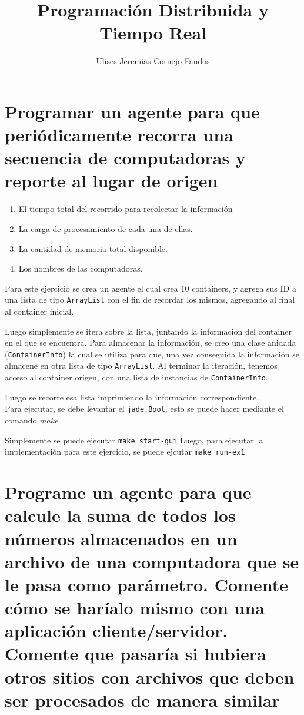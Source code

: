 \documentclass[osajnl,twocolumn,showpacs,superscriptaddress,10pt]{revtex4-1} %
\begin{document}
\title{Programación Distribuida y Tiempo Real}

\author{Ulises Jeremias Cornejo Fandos}

\maketitle %

\section{Programar un agente para que periódicamente recorra una secuencia de computadoras y reporte al lugar de origen}

\begin{enumerate}[label=\alph*)]
  \item El tiempo total del recorrido para recolectar la información
  \item La carga de procesamiento de cada una de ellas.
  \item La cantidad de memoria total disponible.
  \item Los nombres de las computadoras.
\end{enumerate}

Para este ejercicio se crea un agente el cual crea 10 containers, y agrega
sus ID a una lista de tipo \texttt{ArrayList} con el fin de recordar los mismos,
agregando al final al container inicial.

Luego simplemente se itera sobre la lista, juntando la información
del container en el que se encuentra. Para almacenar la información, se
creo una clase anidada (\texttt{ContainerInfo}) la cual se utiliza para que, una vez
conseguida la información se almacene en otra lista de tipo \texttt{ArrayList}.
Al terminar la iteración, tenemos acceso al container origen, con
una lista de instancias de \texttt{ContainerInfo}.

Luego se recorre esa lista imprimiendo la información correspondiente. \\

Para ejecutar, se debe levantar el \texttt{jade.Boot}, esto se puede hacer
mediante el comando \textit{make}.

Simplemente se puede ejecutar \texttt{make start-gui}
Luego, para ejecutar la implementación para este ejercicio,
se puede ejcutar \texttt{make run-ex1}

\section{Programe un agente para que calcule la suma de todos los números
almacenados en un archivo de una computadora que se le pasa como
parámetro. Comente cómo se haríalo mismo con una aplicación
cliente/servidor. Comente que pasaría si hubiera otros sitios con
archivos que deben ser procesados de manera similar}
\end{document}
